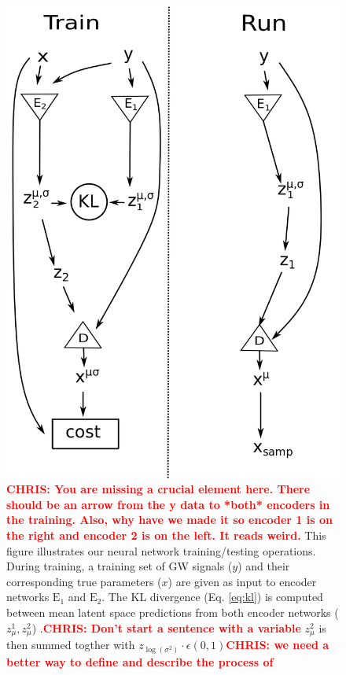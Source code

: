 \documentclass[%
showpacs,
 amsmath,amssymb,
 aps,
 twocolumn,
 prl,
 reprint,
floatfix,
]{revtex4-1}
\newcommand{\chris}[1]{\textbf{\textcolor{red}{CHRIS: #1}}}
\begin{document}
\begin{figure}
    \includegraphics[width=\columnwidth]{images/network_setup.png}
    \caption{\label{fig:network_config}\chris{You are missing a crucial element
here. There should be an arrow from the y data to *both* encoders in the
training. Also, why have we made it so encoder 1 is on the right and encoder 2
is on the left. It reads weird.} This figure illustrates our neural network
training/testing operations. During training, a training set of GW signals
($y$) and their corresponding true parameters ($x$) are given as input to
encoder networks $\textrm{E}_1$ and $\textrm{E}_2$. The KL divergence (Eq.
\ref{eq:kl}) is computed between mean latent space predictions from both
encoder networks ($z^1_{\mu},z^2_{\mu}$) .\chris{Don't start a sentence with a
variable} $z^2_{\mu}$ is then summed togther with $z_{\log{(\sigma^{2})}} \cdot
\epsilon(0,1)$\chris{we need a better way to define and describe the process of
}}
\end{figure}
\end{document}
